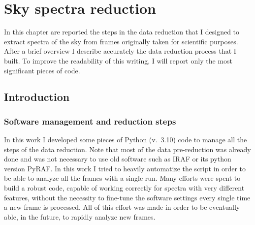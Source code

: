 \chapter{Sky spectra reduction}

In this chapter are reported the steps in the data reduction that I designed to extract spectra of the sky from frames originally taken for scientific purposes. After a brief overview I describe accurately the data reduction process that I built. To improve the readability of this writing, I will report only the most significant pieces of code.

\section{Introduction}

\subsection{Software management and reduction steps}
In this work I developed some pieces of Python (v.\ 3.10) code to manage all the steps of the data reduction. Note that most of the data pre-reduction was already done and was not necessary to use old software such as IRAF or its python version PyRAF. In this work I tried to heavily automatize the script in order to be able to analyze all the frames with a single run. Many efforts were spent to build a robust code, capable of working correctly for spectra with very different features, without the necessity to fine-tune the software settings every single time a new frame is processed. All of this effort was made in order to be eventually able, in the future, to rapidly analyze new frames.

